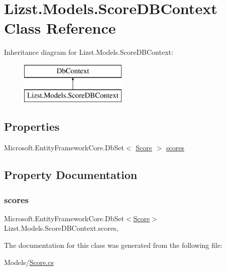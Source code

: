 \hypertarget{class_lizst_1_1_models_1_1_score_d_b_context}{}\section{Lizst.\+Models.\+Score\+D\+B\+Context Class Reference}
\label{class_lizst_1_1_models_1_1_score_d_b_context}
Inheritance diagram for Lizst.\+Models.\+Score\+D\+B\+Context\+:\begin{figure}[H]
\begin{center}
\leavevmode
\includegraphics[height=2.000000cm]{class_lizst_1_1_models_1_1_score_d_b_context}
\end{center}
\end{figure}
\subsection*{Properties}
\begin{DoxyCompactItemize}
\item 
Microsoft.\+Entity\+Framework\+Core.\+Db\+Set$<$ \mbox{\hyperlink{class_lizst_1_1_models_1_1_score}{Score}} $>$ \mbox{\hyperlink{class_lizst_1_1_models_1_1_score_d_b_context_ae0a4efb2ce1a10db3ba3fd85265b7f9b}{scores}}
\end{DoxyCompactItemize}


\subsection{Property Documentation}
\mbox{\label{class_lizst_1_1_models_1_1_score_d_b_context_ae0a4efb2ce1a10db3ba3fd85265b7f9b}} 
\subsubsection{\texorpdfstring{scores}{scores}}
{\footnotesize\ttfamily Microsoft.\+Entity\+Framework\+Core.\+Db\+Set$<$\mbox{\hyperlink{class_lizst_1_1_models_1_1_score}{Score}}$>$ Lizst.\+Models.\+Score\+D\+B\+Context.\+scores\hspace{0.3cm}{\ttfamily [get]}, {\ttfamily [set]}}



The documentation for this class was generated from the following file\+:\begin{DoxyCompactItemize}
\item 
Models/\mbox{\hyperlink{_score_8cs}{Score.\+cs}}\end{DoxyCompactItemize}
